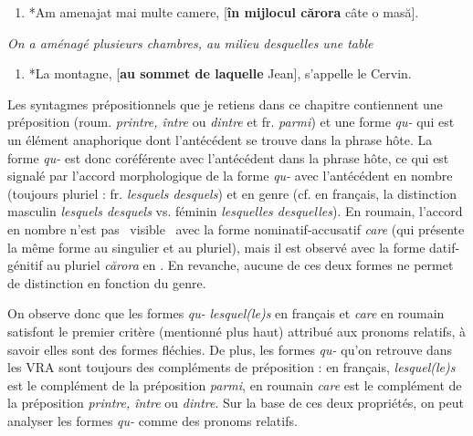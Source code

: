 \begin{enumerate}
\item \label{bkm:Ref294168267}*Am amenajat mai multe camere, [\textbf{în mijlocul cărora} câte o masă]. 


\end{enumerate}
{\itshape
On a aménagé plusieurs chambres, au milieu desquelles une table} 


\begin{enumerate}
\item \label{bkm:Ref294168269}*La montagne, [\textbf{au sommet de laquelle} Jean], s'appelle le Cervin.


\end{enumerate}
Les syntagmes prépositionnels que je retiens dans ce chapitre contiennent une préposition (roum. \textit{printre, între} ou \textit{dintre} et fr. \textit{parmi}) et une forme \textit{qu-} qui est un élément anaphorique dont l'antécédent se trouve dans la phrase hôte. La forme \textit{qu-} est donc coréférente avec l'antécédent dans la phrase hôte, ce qui est signalé par l'accord morphologique de la forme \textit{qu-} avec l'antécédent en nombre (toujours pluriel : fr. \textit{lesquels {\textbar} desquels}) et en genre (cf. en français, la distinction masculin \textit{lesquels {\textbar} desquels} vs. féminin \textit{lesquelles {\textbar} desquelles}). En roumain, l'accord en nombre n'est pas {\guillemotleft}~visible~{\guillemotright} avec la forme nominatif-accusatif \textit{care} (qui présente la même forme au singulier et au pluriel), mais il est observé avec la forme datif-génitif au pluriel \textit{cărora} en . En revanche, aucune de ces deux formes ne permet de distinction en fonction du genre.

On observe donc que les formes \textit{qu-} \textit{lesquel(le)s} en français et \textit{care} en roumain satisfont le premier critère (mentionné plus haut) attribué aux pronoms relatifs, à savoir elles sont des formes fléchies. De plus, les formes \textit{qu-} qu'on retrouve dans les VRA sont toujours des compléments de préposition : en français, \textit{lesquel(le)s} est le complément de la préposition \textit{parmi}, en roumain \textit{care} est le complément de la préposition \textit{printre, între} ou \textit{dintre}. Sur la base de ces deux propriétés, on peut analyser les formes \textit{qu-} comme des pronoms relatifs.   

